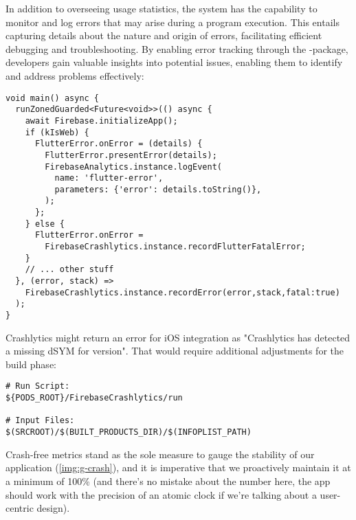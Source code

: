In addition to overseeing usage statistics, the system has the capability to monitor and log errors that may arise 
during a program execution. This entails capturing details about the nature and origin of errors, facilitating efficient 
debugging and troubleshooting. By enabling error tracking through the -package, developers gain 
valuable insights into potential issues, enabling them to identify and address problems effectively:

\begin{lstlisting}
void main() async {
  runZonedGuarded<Future<void>>(() async {
    await Firebase.initializeApp();
    if (kIsWeb) {
      FlutterError.onError = (details) {
        FlutterError.presentError(details);
        FirebaseAnalytics.instance.logEvent(
          name: 'flutter-error', 
          parameters: {'error': details.toString()},
        );
      };
    } else {
      FlutterError.onError =
        FirebaseCrashlytics.instance.recordFlutterFatalError;
    }
    // ... other stuff
  }, (error, stack) =>
    FirebaseCrashlytics.instance.recordError(error,stack,fatal:true)
  );
}
\end{lstlisting}

\noindent Crashlytics might return an error for iOS integration as "Crashlytics has detected a missing dSYM for version".
That would require additional adjustments for the  build phase:

\begin{lstlisting}[language=terminal]
# Run Script: 
${PODS_ROOT}/FirebaseCrashlytics/run

# Input Files: 
$(SRCROOT)/$(BUILT_PRODUCTS_DIR)/$(INFOPLIST_PATH)
\end{lstlisting}

\noindent Crash-free metrics stand as the sole measure to gauge the stability of our application (\cref{img:g-crash}), 
and it is imperative that we proactively maintain it at a minimum of 100\% (and there's no mistake about the number 
here, the app should work with the precision of an atomic clock if we're talking about a user-centric design).

